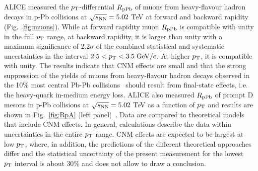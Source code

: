 ALICE measured the $p_{\rm T}$-differential $R_{\rm pPb}$ of muons from heavy-flavour hadron decays in p-Pb collisions at $\sqrt{s_{\rm NN}} = 5.02$ TeV
at forward and backward rapidity~\cite{Acharya:2017hdv} (Fig.~\ref{fig:muons}).
While at forward rapidity muon $R_{\rm pPb}$ is compatible with unity in the full $p_{\rm T}$ range, 
at backward rapidity, it is larger than unity with a maximum 
significance of 2.2$\sigma$ of the combined statistical and systematic uncertainties in the interval $2.5 < p_{\rm T} < 3.5 \;\mathrm{GeV}/c$. 
At higher $p_{\rm T}$, it is compatible with unity. The results indicate
that CNM effects are small and that the strong suppression of the
yields of muons from heavy-flavour hadron decays observed in the
10\% most central Pb-Pb collisions~\cite{Abelev:2012qh} should result from final-state
effects, i.e. the heavy-quark in-medium energy loss. 
ALICE also measured $R_{\rm pPb}$ of prompt D mesons in p-Pb collisions at $\sqrt{s_{\rm NN}} = 5.02$ TeV
as a function of $p_{\rm T}$ and results are shown in Fig.~\ref{fig:RpA} (left panel)~\cite{ALICEPAS2017008}. Data are compared to 
theoretical models that include CNM effects. In general, calculations describe the data within 
uncertainties in the entire $p_{\rm T}$ range. CNM effects are expected to be largest at low $p_{\rm T}$, 
where, in addition, the predictions of the different theoretical approaches differ and the statistical 
uncertainty of the present measurement for the lowest $p_{\rm T}$ interval is about 30\% and does not 
allow to draw a conclusion. \\

